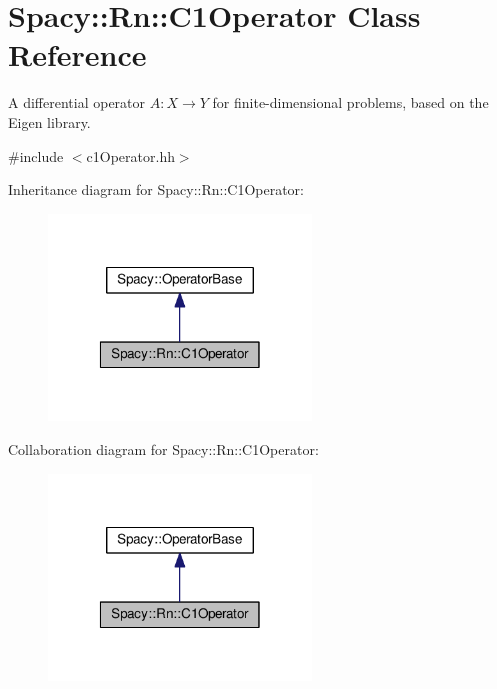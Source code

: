 \hypertarget{classSpacy_1_1Rn_1_1C1Operator}{\section{Spacy\-:\-:Rn\-:\-:C1\-Operator Class Reference}
\label{classSpacy_1_1Rn_1_1C1Operator}
}


A differential operator $A:X\rightarrow Y$ for finite-\/dimensional problems, based on the Eigen library.  




{\ttfamily \#include $<$c1\-Operator.\-hh$>$}



Inheritance diagram for Spacy\-:\-:Rn\-:\-:C1\-Operator\-:
\nopagebreak
\begin{figure}[H]
\begin{center}
\leavevmode
\includegraphics[width=198pt]{classSpacy_1_1Rn_1_1C1Operator__inherit__graph}
\end{center}
\end{figure}


Collaboration diagram for Spacy\-:\-:Rn\-:\-:C1\-Operator\-:
\nopagebreak
\begin{figure}[H]
\begin{center}
\leavevmode
\includegraphics[width=198pt]{classSpacy_1_1Rn_1_1C1Operator__coll__graph}
\end{center}
\end{figure}
